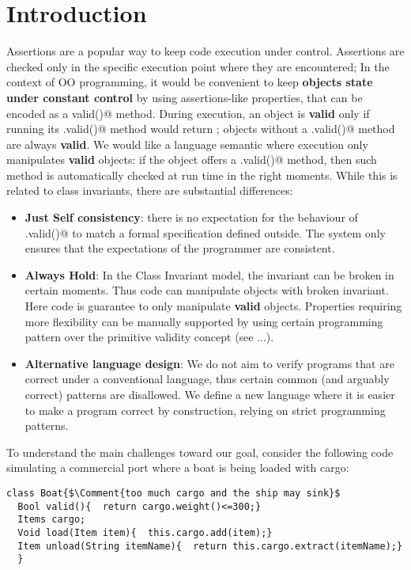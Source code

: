 
\section{Introduction}
Assertions are a popular way to keep code execution
under control. Assertions are checked only in the specific
execution point where they are encountered;
In the context of OO programming, it would be
convenient to keep \textbf{objects state
under constant control} by using assertions-like properties, that
can be encoded as a \Q@Bool valid()@ method.
During execution,
an object is \textbf{valid} only if running its
\Q@.valid()@ method would return \Q@true@;
objects without a \Q@.valid()@ method are always \textbf{valid}.
We would like a language semantic where 
execution only manipulates \textbf{valid} objects:
if the object offers a \Q@.valid()@ method, then such
 method is automatically checked at run time in the right moments.
While this is related to class invariants,
there are substantial differences:
\begin{itemize}
\item \textbf{Just Self consistency}: there is no expectation for
the behaviour of \Q@.valid()@ to match a formal specification defined outside.
The system only ensures that the expectations of the programmer are consistent.
\item \textbf{Always Hold}: 
In the Class Invariant model, the invariant can be broken in
certain moments. Thus code can manipulate objects with broken invariant.
Here code is guarantee to only manipulate \textbf{valid} objects.
Properties requiring more flexibility can be manually supported by
 using certain programming pattern over the primitive validity concept (see ...).
\item \textbf{Alternative language design}:
We do not aim to verify programs that are correct under a conventional language,
thus certain common (and arguably correct) patterns are disallowed.
We define a new language where it is easier to make a program correct by construction, relying on
strict programming patterns.
\end{itemize}

\noindent To understand the main challenges
toward our goal,
consider the following code 
simulating a commercial port
 where a boat is being loaded with cargo:
\saveSpace
\begin{lstlisting}
class Boat{$\Comment{too much cargo and the ship may sink}$
  Bool valid(){  return cargo.weight()<=300;}
  Items cargo;
  Void load(Item item){  this.cargo.add(item);}
  Item unload(String itemName){  return this.cargo.extract(itemName);}
  }
\end{lstlisting}
\saveSpace




